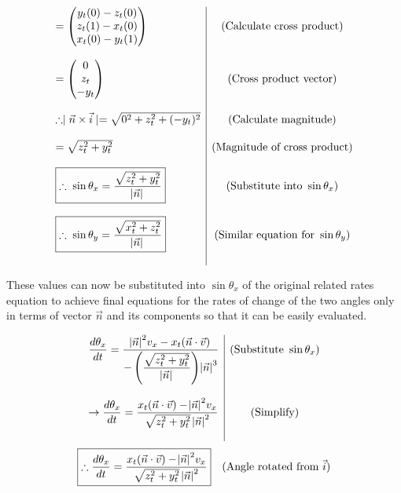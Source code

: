 \documentclass[12pt]{article}
\begin{document}
$$
\begin{array}{l|c}
=\begin{pmatrix} y_t(0) - z_t(0) \\ z_t(1) - x_t(0) \\ x_t(0) - y_t(1) \\
\end{pmatrix} & \text{(Calculate cross product)}\\ \\
= \begin{pmatrix} 0 \\ z_t \\ -y_t \\ 
\end{pmatrix} & \text{(Cross product vector)} \\ \\
\therefore \mid \vec n \times \vec i \mid = \sqrt{0^2 + z_t^2 +(-y_t)^2} & \text{(Calculate magnitude)} \\ \\
= \sqrt{z_t^2 + y_t^2} & \text{(Magnitude of cross product)} \\ \\
\boxed{\therefore \; \sin \theta_x = \frac{\sqrt{z_t^2 + y_t^2}}{\abs{\vec n}}} & \text{(Substitute into } \sin \theta_x \text{)} \\ \\
\boxed{\therefore \; \sin \theta_y = \frac{\sqrt{x_t^2 + z_t^2}}{\abs{\vec n}}} & \text{(Similar equation for } \sin\theta_y \text{)} \\ \\
\end{array} 
$$

\vspace{20pt}
These values can now be substituted into $\sin \theta_x$ of the original related rates equation to achieve final equations for the rates of change of the two angles only in terms of vector $\vec n$ and its components so that it can be easily evaluated.

$$
\begin{array}{l|c}
 \dfrac{d\theta_x}{dt} = \dfrac{{\abs{\vec n}}^2 v_x - x_t(\vec n \cdot \vec v)}{-\left(\dfrac{\sqrt{z_t^2 + y_t^2}}{\abs{\vec n}}\right) {\abs{\vec n}}^3} & \text{(Substitute } \sin \theta_x \text{)} \\ \\
 \rightarrow \dfrac{d\theta_x}{dt} = \dfrac{ x_t(\vec n \cdot \vec v) - {\abs{\vec n}}^2 v_x}{\sqrt{z_t^2 + y_t^2} \; {\abs{\vec n}}^2} & \text{(Simplify)} \\ \\
 \end{array} 
$$
\newline
\begin{equation}
    \boxed{\therefore \frac{d\theta_x}{dt} = \frac{x_t(\vec n \cdot \vec v) - {\abs{\vec n}}^2 v_x}{\sqrt{z_t^2 + y_t^2} {\;\abs{\vec n}}^2}}  \quad \text{(Angle rotated from } \vec i \text{)}
\end{equation}
\end{document}
